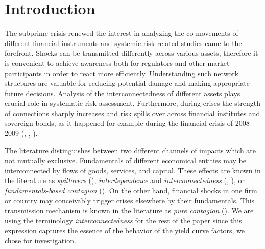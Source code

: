 \documentclass[12pt,bibliography=totoc]{article}
\begin{document}
\newpage

\section{Introduction}

The subprime crisis renewed the interest in analyzing the co-movements of different financial instruments and systemic risk related studies came to the forefront. 
Shocks can be transmitted differently across various assets, therefore it is convenient to achieve awareness both for regulators and other market participants in order to react more efficiently. 
Understanding such network structures are valuable for reducing potential damage and making appropriate future decisions. 
Analysis of the interconnectedness of different assets plays crucial role in systematic risk assessment. 
Furthermore, during crises the strength of connections sharply increases and risk spills over across financial institutes and sovereign bonds, as it happened for example during the financial crisis of 2008-2009 (\cite{diebold2012better}, \cite{diebold2014network}, \cite{demirer2018estimating}).

The literature distinguishes between two different channels of impacts which are not mutually exclusive.
Fundamentals of different economical entities may be interconnected by flows of goods, services, and capital. 
These effects are known in the literature as \textit{spillovers} (\cite{masson1999contagion}), \textit{interdependence} and \textit{interconnectedness}  (\cite{forbes2002no}, \cite{forbes2012big}), or \textit{fundamentals-based contagion} (\cite{kaminsky2000crises}). 
On the other hand, financial shocks in one firm or country may conceivably trigger crises elsewhere by their fundamentals. This transmission mechanism is known in the literature as \textit{pure contagion} (\cite{masson1999contagion}). We are using the terminology \textit{interconnectedness} for the rest of the paper since this expression captures the essence of the behavior of the yield curve factors, we chose for investigation.
\end{document}
